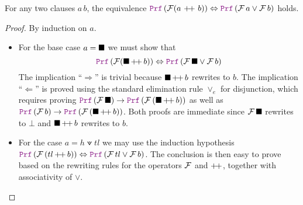 \smallskip

\begin{lemma}\label{lemma:clause-equiv-disj}
For any two clauses $a\,b$, the equivalence $\prf\,(\cal{F}(a~\pp~b)) \Leftrightarrow \prf\,(\cal{F}\,a \lor \cal{F}\,b)$ holds.
\end{lemma}
\begin{proof} By induction on $a$.
  \begin{itemize}
    \item For the base case $a = \nil$ we must show that
    \[
        \prf\, (\cal{F} (\nil\, \pp \, b)) \Leftrightarrow \prf\, (\cal{F}\,\nil \lor \cal{F}\,b)
    \]
    The implication ``$\Rightarrow$'' is trivial because $\nil\,\pp\,b$ rewrites to $b$. The implication ``$\Leftarrow$'' is proved using the standard elimination rule $\lor_e$ for disjunction, which requires proving $\prf\,(\cal{F}\,\nil) \ra \prf\,(\cal{F}\,(\nil\,\pp\,b))$ as well as $\prf\,(\cal{F}\,b) \ra \prf\,(\cal{F}\,(\nil\,\pp\,b))$. Both proofs are immediate since $\cal{F}\,\nil$ rewrites to $\bot$ and $\nil\,\pp\,b$ rewrites to $b$.
    \item For the case $a = h \veedot tl$ we may use the induction hypothesis $\prf\,(\cal{F}\, (tl\, \pp\, b)) \Leftrightarrow \prf\,(\cal{F}\,tl \lor \cal{F}\, b)$. The conclusion is then easy to prove based on the rewriting rules for the operators $\cal{F}$ and $\pp$, together with associativity of $\lor$.
    \end{itemize}
\end{proof}
